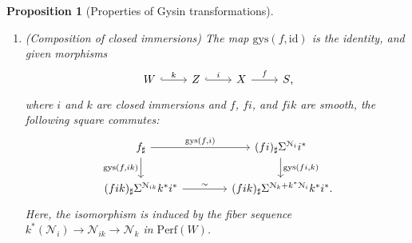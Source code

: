 \documentclass{amsart}
\numberwithin{equation}{section}
\theoremstyle{plain}
\newtheorem{proposition}[equation]{Proposition}
\theoremstyle{definition}
\let\scr=\mathcal
\let\onto=\twoheadrightarrow
\def\id{\mathrm{id}}
\def\Perf{\mathrm{Perf}{}}
\let\phi=\varphi
\begin{document}
\begin{proposition}[Properties of Gysin transformations]
\begin{enumerate}
\[\begin{tikzcd}[column sep=4em]
		\end{tikzcd}
		\]
		\item \textnormal{(Composition of closed immersions)}
		The map $\mathrm{gys}(f,\id)$ is the identity, and 
		given morphisms
		\[
		\begin{tikzcd}
			W \ar[hook]{r}{k} & Z \ar[hook]{r}{i} & X \ar{r}{f} & S\rlap,
		\end{tikzcd}
		\]
		where $i$ and $k$ are closed immersions and $f$, $fi$, and $fik$ are smooth, the following square commutes:
		\[
		\begin{tikzcd}[column sep=4em]
			f_\sharp \ar{r}{\mathrm{gys}(f,i)} \ar{d}[swap]{\mathrm{gys}(f,ik)} & (fi)_\sharp\Sigma^{\scr N_i}i^* \ar{d}{\mathrm{gys}(fi,k)} \\
			 (fik)_\sharp\Sigma^{\scr N_{ik}}k^*i^* \ar{r}{\sim} & (fik)_\sharp\Sigma^{\scr N_k+k^*\scr N_i}k^*i^* \rlap.
		\end{tikzcd}
		\]
		Here, the isomorphism is induced by the fiber sequence $k^*(\scr N_i)\to \scr N_{ik}\to\scr N_k$ in $\Perf(W)$.
	\end{enumerate}
\end{proposition}
\end{document}
